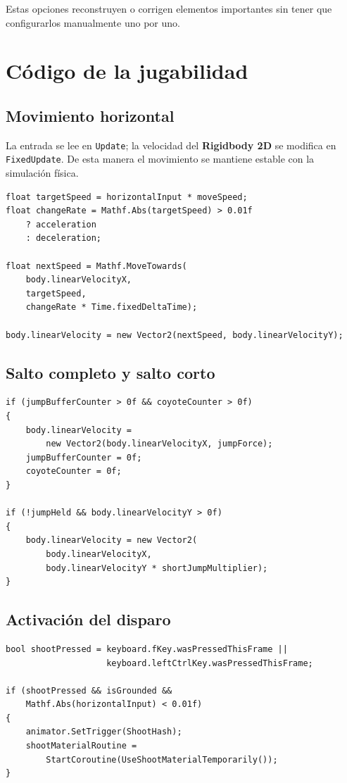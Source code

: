 \documentclass[11pt,a4paper]{article}
\newcommand{\component}[1]{\textbf{\textcolor{metalBlue}{#1}}}
\begin{document}
Estas opciones reconstruyen o corrigen elementos importantes sin tener que configurarlos manualmente uno por uno.

\section{Código de la jugabilidad}

\subsection{Movimiento horizontal}

La entrada se lee en \texttt{Update}; la velocidad del \component{Rigidbody 2D} se modifica en \texttt{FixedUpdate}. De esta manera el movimiento se mantiene estable con la simulación física.

\begin{lstlisting}[style=codestyle]
float targetSpeed = horizontalInput * moveSpeed;
float changeRate = Mathf.Abs(targetSpeed) > 0.01f
    ? acceleration
    : deceleration;

float nextSpeed = Mathf.MoveTowards(
    body.linearVelocityX,
    targetSpeed,
    changeRate * Time.fixedDeltaTime);

body.linearVelocity = new Vector2(nextSpeed, body.linearVelocityY);
\end{lstlisting}

\subsection{Salto completo y salto corto}

\begin{lstlisting}[style=codestyle]
if (jumpBufferCounter > 0f && coyoteCounter > 0f)
{
    body.linearVelocity =
        new Vector2(body.linearVelocityX, jumpForce);
    jumpBufferCounter = 0f;
    coyoteCounter = 0f;
}

if (!jumpHeld && body.linearVelocityY > 0f)
{
    body.linearVelocity = new Vector2(
        body.linearVelocityX,
        body.linearVelocityY * shortJumpMultiplier);
}
\end{lstlisting}

\subsection{Activación del disparo}

\begin{lstlisting}[style=codestyle]
bool shootPressed = keyboard.fKey.wasPressedThisFrame ||
                    keyboard.leftCtrlKey.wasPressedThisFrame;

if (shootPressed && isGrounded &&
    Mathf.Abs(horizontalInput) < 0.01f)
{
    animator.SetTrigger(ShootHash);
    shootMaterialRoutine =
        StartCoroutine(UseShootMaterialTemporarily());
}
\end{lstlisting}
\end{document}
